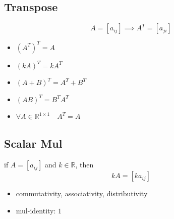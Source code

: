 	\subsection{Transpose}
		\begin{definition}[\texttt{[m,n]ᵀ -> [n,m]}]
			$$A=[a_{ij}]\implies A^T=[a_{ji}]$$
		\end{definition}
		\begin{theorem}
			\begin{itemize}
				\item $(A^T)^T=A$
				\item $(kA)^T=kA^T$
				\item $(A+B)^T=A^T+B^T$
				\item $(AB)^T=B^TA^T$
				\item $\forall A\in\mathbb{R}^{1\times1}\quad A^T=A$
			\end{itemize}
		\end{theorem}
	\subsection{Scalar Mul}
		\begin{definition}[\texttt{[m,n] * k -> [m,n]}]
			if $A=[a_{ij}]$ and $k\in\mathbb{R}$, then
			$$kA=[ka_{ij}]$$
			\begin{itemize}
				\item commutativity, associativity, distributivity 
				\item mul-identity: $1$
			\end{itemize}
		\end{definition}
